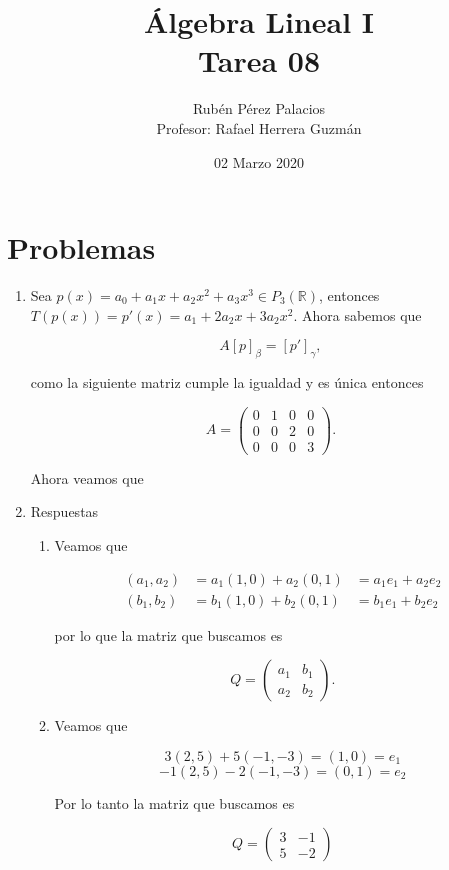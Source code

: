 \documentclass[letterpaper]{article}
\title{Álgebra Lineal I\\Tarea 08}
\author{Rubén Pérez Palacios\\Profesor: Rafael Herrera Guzmán}
\date{02 Marzo 2020}
\theoremstyle{definition}
\theoremstyle{lemathm}
\theoremstyle{lemademthm}
\newcommand{\R}{\mathbb{R}}
\begin{document}
	\maketitle
    
    \section*{Problemas}

    \begin{enumerate}
        
        \item Sea $p(x) = a_0 + a_1x + a_2x^2 + a_3x^3 \in P_3(\R)$, entonces $T(p(x)) = p'(x) = a_1 + 2a_2x + 3a_2x^2$. Ahora sabemos que
		
		\[A[p]_\beta = [p']_\gamma,\]

		como la siguiente matriz cumple la igualdad y es única entonces

		\[A = \begin{pmatrix}
			0 & 1 & 0 & 0\\
			0 & 0 & 2 & 0\\
			0 & 0 & 0 & 3
		\end{pmatrix}.\]

		Ahora veamos que

		\item Respuestas
		
		\begin{enumerate}
		
			\item Veamos que
			
			\begin{align*}
				(a_1,a_2) &= a_1(1,0) + a_2(0,1) &= a_1e_1 + a_2e_2\\
				(b_1,b_2) &= b_1(1,0) + b_2(0,1) &= b_1e_1 + b_2e_2
			\end{align*}

			por lo que la matriz que buscamos es

			\[Q = \begin{pmatrix}
				a_1 & b_1\\
				a_2 & b_2
			\end{pmatrix}.\]

			\item Veamos que
			
			\[3(2,5) + 5(-1,-3) = (1,0) = e_1\]
			\[-1(2,5) - 2(-1,-3) = (0,1) = e_2\]

			Por lo tanto la matriz que buscamos es

			\[Q = \begin{pmatrix}
				3 & -1\\
				5 & -2
			\end{pmatrix}\]


\end{enumerate}
\end{enumerate}
\end{document}
